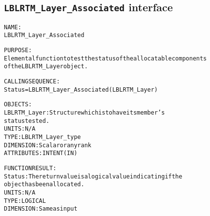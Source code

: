 \subsection{\texttt{LBLRTM\_Layer\_Associated} interface}
  \label{sec:LBLRTM_Layer_Associated_interface}
  \begin{alltt}
 
  NAME:
        LBLRTM_Layer_Associated
 
  PURPOSE:
        Elemental function to test the status of the allocatable components
        of the LBLRTM_Layer object.
 
  CALLING SEQUENCE:
        Status = LBLRTM_Layer_Associated( LBLRTM_Layer )
 
  OBJECTS:
        LBLRTM_Layer:  Structure which is to have its member's
                       status tested.
                       UNITS:      N/A
                       TYPE:       LBLRTM_Layer_type
                       DIMENSION:  Scalar or any rank
                       ATTRIBUTES: INTENT(IN)
 
  FUNCTION RESULT:
        Status:        The return value is a logical value indicating if the
                       object has been allocated.
                       UNITS:      N/A
                       TYPE:       LOGICAL
                       DIMENSION:  Same as input
 
  \end{alltt}
